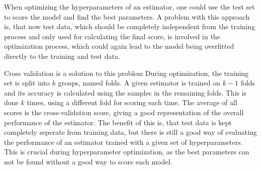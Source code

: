 When optimizing the hyperparameters of an estimator, one could use the test set to score
the model and find the best parameters. A problem with this approach is, that now test data,
which should be completely independent from the training process and only used for calculating
the final score, is involved in the optimization process, which could again lead to the model being
overfitted directly to the training and test data.

Cross validation is a solution to this problem During optimization, the training set is
split into $k$ groups, named folds. A given estimator is trained on $k-1$ folds and its accuracy
is calculated using the samples in the remaining folds. This is done $k$ times, using a different fold
for scoring each time. The average of all scores is the cross-validation score, giving a good
representation of the overall performance of the estimator.
The benefit of this is, that test data is kept completely seperate from training data, but there
is still a good way of evaluating the performance of an estimator trained with a given set
of hyperparameters. This is crucial during hyperparameter optimization, as the best parameters
can not be found without a good way to score each model.




